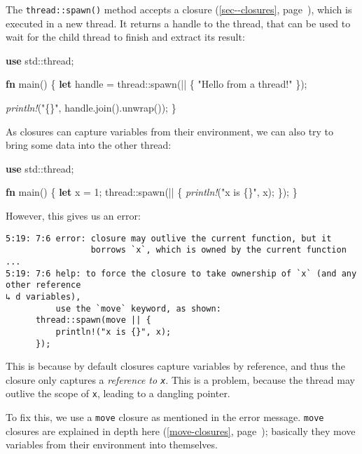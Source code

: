 \documentclass[a4paper,]{book}
\renewcommand*{\hyperlink}[2]{%
 #2 (\autoref{#1}, page~\pageref{#1})}
\newenvironment{Shaded}{\begin{snugshade}}{\end{snugshade}}
\newcommand{\KeywordTok}[1]{\textcolor[rgb]{0.13,0.29,0.53}{\textbf{{#1}}}}
\newcommand{\DecValTok}[1]{\textcolor[rgb]{0.00,0.00,0.81}{{#1}}}
\newcommand{\StringTok}[1]{\textcolor[rgb]{0.31,0.60,0.02}{{#1}}}
\newcommand{\PreprocessorTok}[1]{\textcolor[rgb]{0.56,0.35,0.01}{\textit{{#1}}}}
\newcommand{\NormalTok}[1]{{#1}}
\begin{document}
The \texttt{thread::spawn()} method accepts a
\protect\hyperlink{sec--closures}{closure}, which is executed in a new
thread. It returns a handle to the thread, that can be used to wait for
the child thread to finish and extract its result:

\begin{Shaded}
\begin{Highlighting}[]
\KeywordTok{use} \NormalTok{std::thread;}

\KeywordTok{fn} \NormalTok{main() \{}
    \KeywordTok{let} \NormalTok{handle = thread::spawn(|| \{}
        \StringTok{"Hello from a thread!"}
    \NormalTok{\});}

    \PreprocessorTok{println!}\NormalTok{(}\StringTok{"\{\}"}\NormalTok{, handle.join().unwrap());}
\NormalTok{\}}
\end{Highlighting}
\end{Shaded}

As closures can capture variables from their environment, we can also
try to bring some data into the other thread:

\begin{Shaded}
\begin{Highlighting}[]
\KeywordTok{use} \NormalTok{std::thread;}

\KeywordTok{fn} \NormalTok{main() \{}
    \KeywordTok{let} \NormalTok{x = }\DecValTok{1}\NormalTok{;}
    \NormalTok{thread::spawn(|| \{}
        \PreprocessorTok{println!}\NormalTok{(}\StringTok{"x is \{\}"}\NormalTok{, x);}
    \NormalTok{\});}
\NormalTok{\}}
\end{Highlighting}
\end{Shaded}

However, this gives us an error:

\begin{verbatim}
5:19: 7:6 error: closure may outlive the current function, but it
                 borrows `x`, which is owned by the current function
...
5:19: 7:6 help: to force the closure to take ownership of `x` (and any other reference
↳ d variables),
          use the `move` keyword, as shown:
      thread::spawn(move || {
          println!("x is {}", x);
      });
\end{verbatim}

This is because by default closures capture variables by reference, and
thus the closure only captures a \emph{reference to \texttt{x}}. This is
a problem, because the thread may outlive the scope of \texttt{x},
leading to a dangling pointer.

To fix this, we use a \texttt{move} closure as mentioned in the error
message. \texttt{move} closures are explained in depth
\protect\hyperlink{move-closures}{here}; basically they move variables
from their environment into themselves.
\end{document}
